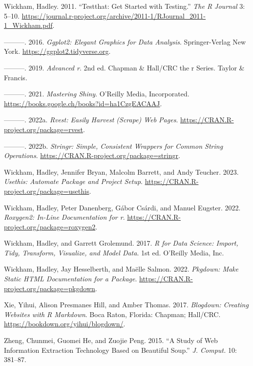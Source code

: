 \documentclass[
  12pt,
  letterpaper,
]{krantz}
\newlength{\cslhangindent}
\newlength{\cslentryspacingunit} %
\newenvironment{CSLReferences}[2] %
 {%
  \setlength{\parindent}{0pt}
  \ifodd #1
  \let\oldpar\par
  \def\par{\hangindent=\cslhangindent\oldpar}
  \fi
  \setlength{\parskip}{#2\cslentryspacingunit}
 }%
 {}
\begin{document}
\begin{CSLReferences}{1}{0}
\leavevmode{}%
Wickham, Hadley. 2011. {``Testthat: Get Started with Testing.''}
\emph{The R Journal} 3: 5--10.
\url{https://journal.r-project.org/archive/2011-1/RJournal_2011-1_Wickham.pdf}.

\leavevmode{}%
---------. 2016. \emph{Ggplot2: Elegant Graphics for Data Analysis}.
Springer-Verlag New York. \url{https://ggplot2.tidyverse.org}.

\leavevmode{}%
---------. 2019. \emph{Advanced r}. 2nd ed. Chapman \& Hall/CRC the r
Series. Taylor \& Francis.

\leavevmode{}%
---------. 2021. \emph{Mastering Shiny}. O'Reilly Media, Incorporated.
\url{https://books.google.ch/books?id=ha1CzgEACAAJ}.

\leavevmode{}%
---------. 2022a. \emph{Rvest: Easily Harvest (Scrape) Web Pages}.
\url{https://CRAN.R-project.org/package=rvest}.

\leavevmode{}%
---------. 2022b. \emph{Stringr: Simple, Consistent Wrappers for Common
String Operations}. \url{https://CRAN.R-project.org/package=stringr}.

\leavevmode{}%
Wickham, Hadley, Jennifer Bryan, Malcolm Barrett, and Andy Teucher.
2023. \emph{Usethis: Automate Package and Project Setup}.
\url{https://CRAN.R-project.org/package=usethis}.

\leavevmode{}%
Wickham, Hadley, Peter Danenberg, Gábor Csárdi, and Manuel Eugster.
2022. \emph{Roxygen2: In-Line Documentation for r}.
\url{https://CRAN.R-project.org/package=roxygen2}.

\leavevmode{}%
Wickham, Hadley, and Garrett Grolemund. 2017. \emph{R for Data Science:
Import, Tidy, Transform, Visualize, and Model Data}. 1st ed. O'Reilly
Media, Inc.

\leavevmode{}%
Wickham, Hadley, Jay Hesselberth, and Maëlle Salmon. 2022.
\emph{Pkgdown: Make Static HTML Documentation for a Package}.
\url{https://CRAN.R-project.org/package=pkgdown}.

\leavevmode{}%
Xie, Yihui, Alison Presmanes Hill, and Amber Thomas. 2017.
\emph{Blogdown: Creating Websites with {R} Markdown}. Boca Raton,
Florida: Chapman; Hall/CRC. \url{https://bookdown.org/yihui/blogdown/}.

\leavevmode{}%
Zheng, Chunmei, Guomei He, and Zuojie Peng. 2015. {``A Study of Web
Information Extraction Technology Based on Beautiful Soup.''} \emph{J.
Comput.} 10: 381--87.

\end{CSLReferences}



\printindex
\end{document}
